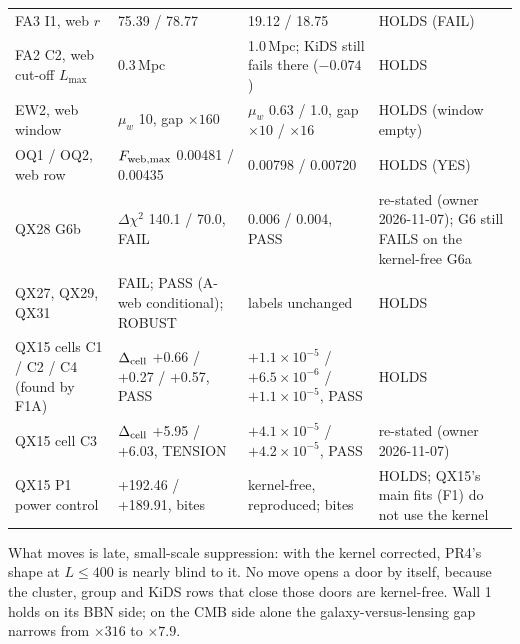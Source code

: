 \documentclass[10pt]{article}
\begin{document}
{\begin{longtable}{@{}p{4.2cm}p{3.6cm}p{4.4cm}p{3.2cm}@{}}
FA3 I1, web $r$ & 75.39 / 78.77 & 19.12 / 18.75 & HOLDS (FAIL)\\
FA2 C2, web cut-off $L_{\max}$ & 0.3\,Mpc & 1.0\,Mpc; KiDS still fails there ($-0.074$) & HOLDS\\
EW2, web window & $\mu_w$ 10, gap $\times160$ & $\mu_w$ 0.63 / 1.0, gap $\times10$ / $\times16$ & HOLDS (window empty)\\
OQ1 / OQ2, web row & $F_{\rm web,max}$ 0.00481 / 0.00435 & 0.00798 / 0.00720 & HOLDS (YES)\\
QX28 G6b & $\Delta\chi^2$ 140.1 / 70.0, FAIL & 0.006 / 0.004, PASS & re-stated (owner 2026-11-07); G6 still FAILS on the kernel-free G6a\\
QX27, QX29, QX31 & FAIL; PASS (A-web conditional); ROBUST & labels unchanged & HOLDS\\
QX15 cells C1 / C2 / C4 (found by F1A) & $\Delta_{\rm cell}$ +0.66 / +0.27 / +0.57, PASS & $+1.1\times10^{-5}$ / $+6.5\times10^{-6}$ / $+1.1\times10^{-5}$, PASS & HOLDS\\
QX15 cell C3 & $\Delta_{\rm cell}$ +5.95 / +6.03, TENSION & $+4.1\times10^{-5}$ / $+4.2\times10^{-5}$, PASS & re-stated (owner 2026-11-07)\\
QX15 P1 power control & +192.46 / +189.91, bites & kernel-free, reproduced; bites & HOLDS; QX15's main fits (F1) do not use the kernel\\\bottomrule
\end{longtable}}
What moves is late, small-scale suppression: with the kernel corrected, PR4's shape at $L\le400$ is nearly blind to it. No move opens a door by itself, because the cluster, group and KiDS rows that close those doors are kernel-free. Wall 1 holds on its BBN side; on the CMB side alone the galaxy-versus-lensing gap narrows from $\times316$ to $\times7.9$.
\end{document}

